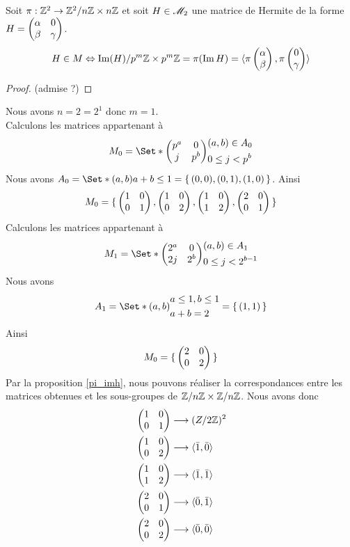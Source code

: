 \documentclass[12pt]{article}
\newcommand*{\pmZpmZ }{p^m\Z \x p^m\Z}
\newcommand*{\ZZnZ}{\Z^2/\nZnZ}
\newcommand{\ZnZ}{\Z/n\Z}
\newcommand{\ZZ}{\ZnZ \x \ZnZ}
\newcommand{\nZnZ}{n\Z \x n\Z}
\begin{document}
\begin{proposition}\label{pi_imh}
	Soit $\sapp{\pi}{\Z^2}{\ZZnZ}$ et soit $H \in \mathscr{M}_2$ une matrice de Hermite de la forme
	$ H = \begin{pmatrix} \alpha & 0\\ \beta & \gamma \end{pmatrix}$.
	$$H \in M \ssi \im(H)/\pmZpmZ = \pi(\im H) =
		\gen{\pi\vectcolsqr{\alpha}{\beta}, \pi\vectcolsqr{0}{\gamma}}$$
\end{proposition}
\begin{proof}
	(admise ?)
\end{proof}

\newpage
\begin{example}[Cas pour $n = 2$]
	Nous avons $n = 2 = 2^1$ donc $m = 1$.\\
	Calculons les matrices appartenant à $$M_0 = \Set*{
			\begin{pmatrix}
				p^a & 0   \\
				j   & p^b
			\end{pmatrix}
		}{
			\begin{aligned}
				 & (a, b) \in A_0  \\
				 & 0 \le j < p^{b}
			\end{aligned}
		}$$
	Nous avons $A_0 = \Set*{(a,b)}{a + b \le 1} = \set{(0,0), (0,1), (1, 0)}$.
	Ainsi
	\begin{equation*}
		M_0 = \{\,
			\begin{pmatrix} 1 & 0\\ 0 & 1 \end{pmatrix}, \begin{pmatrix} 1 & 0\\ 0 & 2 \end{pmatrix}, \begin{pmatrix} 1 & 0\\ 1 & 2 \end{pmatrix}, \begin{pmatrix} 2 & 0\\ 0 & 1 \end{pmatrix}
		 \,\}
	\end{equation*}
	Calculons les matrices appartenant à $$M_1 = \Set*{
			\matsqr{2^a}{0}{2j}{2^b}
		}{
			\begin{aligned}
				 & (a, b) \in A_1      \\
				 & 0 \le j < 2^{b - 1}
			\end{aligned}
		}$$
	Nous avons $$A_1 = \Set*{
			(a,b)}{
			\begin{aligned}
				 & a \le 1, b \le 1 \\
				 & a + b = 2
			\end{aligned}
		} = \set{(1,1)}$$
	Ainsi
	$$M_0 = \{\,\begin{pmatrix} 2 & 0\\ 0 & 2 \end{pmatrix} \,\}$$
	Par la proposition \ref{pi_imh}, nous pouvons réaliser la correspondances entre
	les matrices obtenues et les sous-groupes de $\ZZ$. Nous avons donc
	\begin{equation*}
		\begin{aligned}
			 & \begin{pmatrix} 1 & 0\\ 0 & 1 \end{pmatrix}\longrightarrow (Z/2\mathbb Z)^2              \\
			 & \begin{pmatrix} 1 & 0\\ 0 & 2 \end{pmatrix}\longrightarrow \langle  \bar 1, \bar 0 \rangle  \\
			 & \begin{pmatrix} 1 & 0\\ 1 & 2 \end{pmatrix}\longrightarrow \langle  \bar 1,  \bar 1 \rangle \\
			 & \begin{pmatrix} 2 & 0\\ 0 & 1 \end{pmatrix} \longrightarrow \langle  \bar 0, \bar 1 \rangle \\
			 & \begin{pmatrix} 2 & 0\\ 0 & 2 \end{pmatrix} \longrightarrow \langle  \bar 0, \bar 0 \rangle
		\end{aligned}
	\end{equation*}
\end{example}
\end{document}
